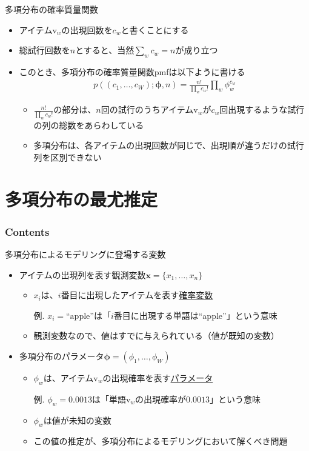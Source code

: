 \documentclass[aspectratio=169,unicode,dvipdfmx,14pt]{beamer}
\begin{document}
\begin{frame}{多項分布の確率質量関数}
\begin{itemize}
\item アイテム$\mbox{v}_w$の出現回数を$c_w$と書くことにする
\item 総試行回数を$n$とすると、当然$\sum_w c_w = n$が成り立つ
\item このとき、多項分布の確率質量関数pmfは以下ように書ける
\begin{align}
p((c_1,\ldots,c_W);\bm{\phi},n) = \frac{n!}{\prod_w c_w!}\prod_w\phi_w^{c_w}
\end{align}
\begin{itemize}
\item $\frac{n!}{\prod_w c_w!}$の部分は、$n$回の試行のうちアイテム$\mbox{v}_w$が$c_w$回出現するような試行の列の総数をあらわしている
\item 多項分布は、各アイテムの出現回数が同じで、出現順が違うだけの試行列を区別できない
\end{itemize}
\end{itemize}
\end{frame}

\section{多項分布の最尤推定}

\begin{frame}\frametitle{Contents}
\Large \tableofcontents[currentsection]
\end{frame}

\begin{frame}{多項分布によるモデリングに登場する変数}
\begin{itemize}
\item アイテムの出現列を表す観測変数$\bm{x}=\{x_1,\ldots,x_n\}$
\begin{itemize}
\item $x_i$は、$i$番目に出現したアイテムを表す\underline{確率変数}
\item[例.] $x_i = \mbox{``apple''}$は「$i$番目に出現する単語は``apple''」という意味
\item 観測変数なので、値はすでに与えられている（値が既知の変数）
\end{itemize}
\item 多項分布のパラメータ$\bm{\phi}=(\phi_1,\ldots,\phi_W)$
\begin{itemize}
\item $\phi_w$は、アイテム$\mbox{v}_w$の出現確率を表す\underline{パラメータ}
\item[例.] $\phi_w=0.0013$は「単語$\mbox{v}_w$の出現確率が$0.0013$」という意味
\item $\phi_w$は値が未知の変数
\item この値の推定が、多項分布によるモデリングにおいて解くべき問題
\end{itemize}
\end{itemize}
\end{frame}
\end{document}
